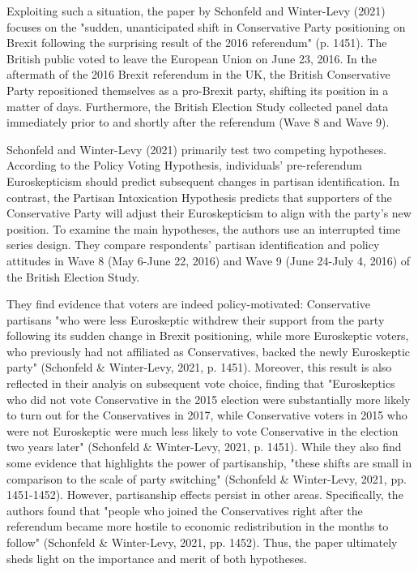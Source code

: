 \documentclass[12pt,letterpaper]{article}
\begin{document}
	Exploiting such a situation, the paper by Schonfeld and Winter-Levy (2021) focuses on the "sudden, unanticipated shift in Conservative Party positioning on Brexit following the surprising result of the 2016 referendum" (p. 1451). The British public voted to leave the European Union on June 23, 2016. In the aftermath of the 2016 Brexit referendum in the UK, the British Conservative Party repositioned themselves as a pro-Brexit party, shifting its position in a matter of days. Furthermore, the British Election Study collected panel data immediately prior to and shortly after the referendum (Wave 8 and Wave 9).  
	
	Schonfeld and Winter-Levy (2021) primarily test two competing hypotheses. According to the Policy Voting Hypothesis, individuals’ pre-referendum Euroskepticism should predict subsequent changes in partisan identification. In contrast, the Partisan Intoxication Hypothesis predicts that supporters of the Conservative Party will adjust their Euroskepticism to align with the party’s new position. To examine the main hypotheses, the authors use an interrupted time series design. They compare respondents’ partisan identification and policy attitudes in Wave 8 (May 6-June 22, 2016) and Wave 9 (June 24-July 4, 2016) of the British Election Study.
	
	They find evidence that voters are indeed policy-motivated: Conservative partisans  "who were less Euroskeptic withdrew their support from the party following its sudden change in Brexit positioning, while more Euroskeptic voters, who previously had not affiliated as Conservatives, backed the newly Euroskeptic party" (Schonfeld \& Winter-Levy, 2021, p. 1451). Moreover, this result is also reflected in their analyis on subsequent vote choice, finding that "Euroskeptics who did not vote Conservative in the 2015 election were substantially more likely to turn out for the Conservatives in 2017, while Conservative voters in 2015 who were not Euroskeptic were much less likely to vote Conservative in the election two years later" (Schonfeld \& Winter-Levy, 2021, p. 1451). While they also find some evidence that
	highlights the power of partisanship, "these shifts are small in comparison to the scale of party switching" (Schonfeld \& Winter-Levy, 2021, pp. 1451-1452). However, partisanship effects persist in other areas. Specifically, the authors found that "people who joined the Conservatives right after the referendum became more hostile to economic redistribution in the months to follow" (Schonfeld \& Winter-Levy, 2021, pp. 1452). Thus, the paper ultimately sheds light on the importance and merit of both hypotheses. 
	
\end{document}
